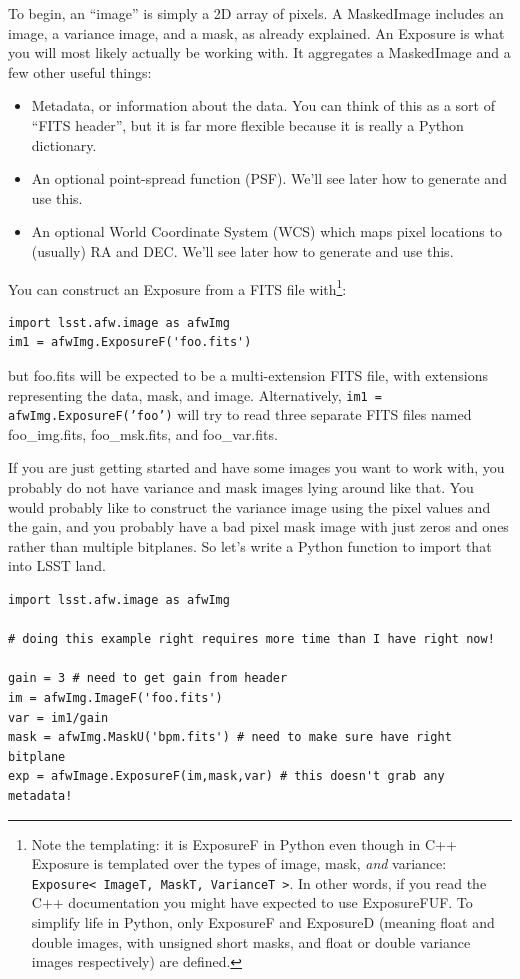 To begin, an ``image'' is simply a 2D array of pixels. A MaskedImage
includes an image, a variance image, and a mask, as already explained.
An Exposure is what you will most likely actually be working with.  It
aggregates a MaskedImage and a few other useful things: 
\begin{itemize}
\item Metadata, or information about the data.  You can think of this
  as a sort of ``FITS header'', but it is far more flexible because it
  is really a Python dictionary.
\item An optional point-spread function (PSF).  We'll see later how to
  generate and use this.
\item An optional World Coordinate System (WCS) which maps pixel
  locations to (usually) RA and DEC. We'll see later how to generate
  and use this.
\end{itemize}

You can construct an Exposure from a FITS file with\footnote{Note the
  templating: it is ExposureF in Python even though in C++ Exposure is
  templated over the types of image, mask, {\it and} variance:
  \texttt{Exposure< ImageT, MaskT, VarianceT >}.  In other words, if
  you read the C++ documentation you might have expected to use
  ExposureFUF.  To simplify life in Python, only ExposureF and
  ExposureD (meaning float and double images, with unsigned short
  masks, and float or double variance images respectively) are
  defined.}:
\begin{verbatim}
import lsst.afw.image as afwImg
im1 = afwImg.ExposureF('foo.fits')
\end{verbatim}
but foo.fits will be expected to be a multi-extension FITS file, with
extensions representing the data, mask, and image. Alternatively, 
\texttt{im1 = afwImg.ExposureF('foo')} will try to read three separate
FITS files named foo\_img.fits, foo\_msk.fits, and foo\_var.fits.

If you are just getting started and have some images you want to work
with, you probably do not have variance and mask images lying around
like that.  You would probably like to construct the variance image
using the pixel values and the gain, and you probably have a bad pixel
mask image with just zeros and ones rather than multiple bitplanes.
So let's write a Python function to import that into LSST land.

\begin{verbatim}
import lsst.afw.image as afwImg

# doing this example right requires more time than I have right now!

gain = 3 # need to get gain from header
im = afwImg.ImageF('foo.fits')
var = im1/gain
mask = afwImg.MaskU('bpm.fits') # need to make sure have right bitplane
exp = afwImage.ExposureF(im,mask,var) # this doesn't grab any metadata!
\end{verbatim}


